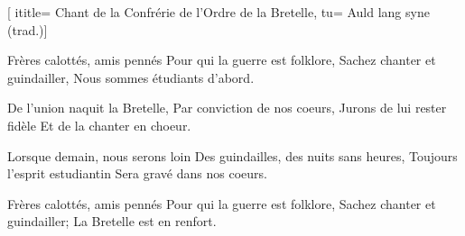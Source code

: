  [
ititle= {Chant de la Confrérie de l'Ordre de la Bretelle},
tu= {Auld lang syne (trad.)}]

\beginverse
Frères calottés, amis pennés
Pour qui la guerre est folklore,
Sachez chanter et guindailler,
Nous sommes étudiants d'abord.
\endverse

\beginverse
De l'union naquit la Bretelle,
Par conviction de nos coeurs,
Jurons de lui rester fidèle
Et de la chanter en choeur.
\endverse

\beginverse
Lorsque demain, nous serons loin
Des guindailles, des nuits sans heures,
Toujours l'esprit estudiantin
Sera gravé dans nos coeurs.
\endverse

\beginverse
Frères calottés, amis pennés
Pour qui la guerre est folklore,
Sachez chanter et guindailler;
La Bretelle est en renfort.
\endverse

\endsong